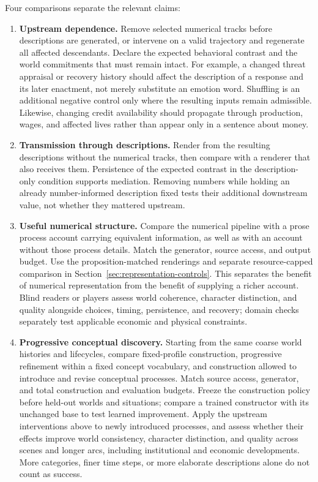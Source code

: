 \documentclass[10pt]{article}
\begin{document}
Four comparisons separate the relevant claims:
\begin{enumerate}[nosep]
  \item \textbf{Upstream dependence.} Remove selected numerical tracks before
    descriptions are generated, or intervene on a valid trajectory and
    regenerate all affected descendants. Declare the expected behavioral
    contrast and the world commitments that must remain intact. For example,
    a changed threat appraisal or recovery history should affect the
    description of a response and its later enactment, not merely substitute
    an emotion word. Shuffling is an additional negative control only where
    the resulting inputs remain admissible.
    Likewise, changing credit availability should propagate through production,
    wages, and affected lives rather than appear only in a sentence about money.
  \item \textbf{Transmission through descriptions.} Render from the resulting
    descriptions without the numerical tracks, then compare with a renderer
    that also receives them. Persistence of the expected contrast in the
    description-only condition supports mediation. Removing numbers while
    holding an already number-informed description fixed tests their
    additional downstream value, not whether they mattered upstream.
  \item \textbf{Useful numerical structure.} Compare the numerical pipeline
    with a prose process account carrying equivalent information, as well as
    with an account without those process details. Match the generator,
    source access, and output budget. Use the proposition-matched renderings
    and separate resource-capped comparison in
    Section~\ref{sec:representation-controls}. This separates the benefit of
    numerical representation from the benefit of supplying a richer account.
    Blind readers or players assess world coherence, character distinction,
    and quality alongside choices, timing, persistence, and recovery; domain
    checks separately test applicable economic and physical constraints.
  \item \textbf{Progressive conceptual discovery.} Starting from the same
    coarse world histories and lifecycles, compare fixed-profile construction,
    progressive refinement within a fixed concept vocabulary, and construction
    allowed to introduce and revise conceptual processes. Match source access,
    generator, and total construction and evaluation budgets. Freeze the
    construction policy before held-out worlds and situations; compare a
    trained constructor with its unchanged base to test learned improvement.
    Apply the upstream interventions above to newly introduced processes, and
    assess whether their effects improve world consistency, character
    distinction, and quality across scenes and longer arcs, including
    institutional and economic developments. More categories, finer time
    steps, or more elaborate descriptions alone do not count as success.
\end{enumerate}
\end{document}
